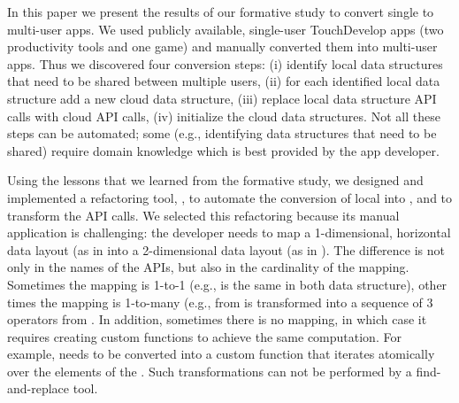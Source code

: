 \documentclass{sigplanconf}
\begin{document}
In this paper we present the results of our formative study to convert single to multi-user apps. We used \numFormative publicly available, single-user TouchDevelop apps (two productivity tools and one game) and manually converted them into multi-user apps. Thus we discovered four conversion steps: (i) identify local data structures that need to be shared between multiple users, (ii) for each identified local data structure add a new cloud data structure, (iii) replace local data structure API calls with cloud API calls, (iv) initialize the cloud data structures. Not all these steps can be automated; some (e.g., identifying data structures that need to be shared) require domain knowledge which is best provided by the app developer. 

Using the lessons that we learned from the formative study, we designed and implemented a refactoring tool, \tool, to automate the conversion of local  into , and to transform the API calls. We selected this refactoring because its manual application is 
challenging: the developer needs to map a 1-dimensional, horizontal data layout (as in  into a 2-dimensional data layout (as in ).
The difference is not only in the names of the APIs, but also in the cardinality of the mapping.
Sometimes the mapping is 1-to-1 (e.g.,  is the same in both data structure), other times the mapping is 1-to-many (e.g.,  from  is transformed into a sequence of 3 operators from . In addition, sometimes there is no mapping, in which case it requires creating custom functions to achieve the same computation. For example,  needs to be converted into a custom function that iterates atomically over the elements of the . Such transformations can not be performed by a find-and-replace tool.
\end{document}
